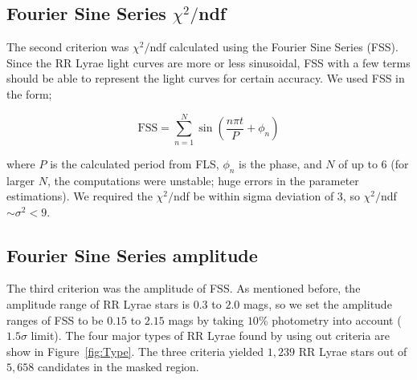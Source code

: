 \documentclass[aps,prb,twocolumn,superscriptaddress]{revtex4-1}
\begin{document}
\subsection{Fourier Sine Series $\chi^2/$ndf}
The second criterion was $\chi^2/$ndf calculated using the Fourier Sine Series (FSS). Since the RR Lyrae light curves are more or less sinusoidal, FSS with a few terms should be able to represent the light curves for certain accuracy. We used FSS in the form;

\begin{equation}
\label{FSS}
\text{FSS} = \sum_{n=1}^{N} \sin{\left(\frac{n \pi t}{P} + \phi_n \right)}
\end{equation}

\noindent where $P$ is the calculated period from FLS, $\phi_n$ is the phase, and $N$ of up to $6$ (for larger $N$, the computations were unstable; huge errors in the parameter estimations). We required the $\chi^2/$ndf be within sigma deviation of $3$, so $\chi^2/$ndf $\sim \sigma^2 < 9$. 

\subsection{Fourier Sine Series amplitude}
The third criterion was the amplitude of FSS. As mentioned before, the amplitude range of RR Lyrae stars is $0.3$ to $2.0$ mags, so we set the amplitude ranges of FSS to be $0.15$ to $2.15$ mags by taking $10\%$ photometry into account ($1.5\sigma$ limit). The four major types of RR Lyrae found by using out criteria are show in Figure~\ref{fig:Type}. The three criteria yielded $1,239$ RR Lyrae stars out of $5,658$ candidates in the masked region.
\end{document}
